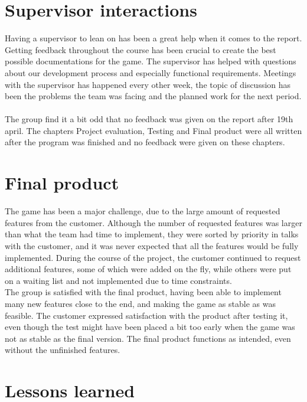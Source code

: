 \section{Supervisor interactions}
Having a supervisor to lean on has been a great help when it comes to the report. Getting feedback throughout the course has been crucial to create the best possible documentations for the game. The supervisor has helped with questions about our development process and especially functional requirements. Meetings with the supervisor has happened every other week, the topic of discussion has been the problems the team was facing and the planned work for the next period. \\
\\
The group find it a bit odd that no feedback was given on the report after 19th april. The chapters Project evaluation, Testing and Final product were all written after the program was finished and no feedback were given on these chapters.

\section{Final product}

The game has been a major challenge, due to the large amount of requested features from the customer. Although the number of requested features was larger than what the team had time to implement, they were sorted by priority in talks with the customer, and it was never expected that all the features would be fully implemented. During the course of the project, the customer continued to request additional features, some of which were added on the fly, while others were put on a waiting list and not implemented due to time constraints.\\
\newline
The group is satisfied with the final product, having been able to implement many new features close to the end, and making the game as stable as was feasible. The customer expressed satisfaction with the product after testing it, even though the test might have been placed a bit too early when the game was not as stable as the final version. The final product functions as intended, even without the unfinished features.\\

\section{Lessons learned}

